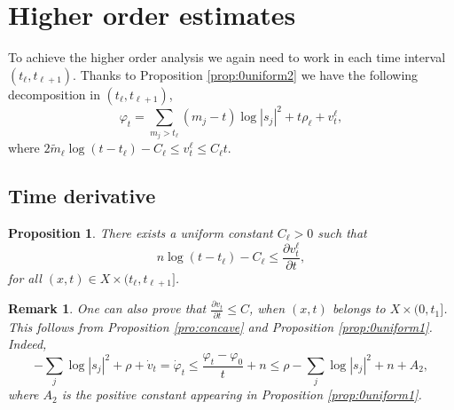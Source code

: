 \documentclass[11pt]{amsart}
\numberwithin{equation}{section}
\newtheorem{prop}[theorem]{Proposition}
\newtheorem{remark}[theorem]{Remark}
\newcommand{\f}{\varphi}
\begin{document}
  


 






\section{Higher order estimates}  \label{sec:logsmooth}

To achieve the higher order analysis we again need to  work in each time interval $(t_{\ell},t_{\ell+1})$. 
 Thanks to Proposition \ref{prop:0uniform2} we have the following decomposition in $(t_\ell, t_{\ell+1})$,
 $$
\f_t=\sum_{m_j>t_{\ell}} (m_j-t) \log |s_j|^2+t \rho_{\ell}+v_t^\ell,
$$
where $ 2 \tilde{m}_\ell \log (t-t_\ell) -C_\ell  \leq v_{t}^{\ell} \leq C_\ell t$.


   
   
 
 \subsection{Time derivative}
 
\begin{prop} \label{pro:STbelow}
There exists a uniform constant $C_\ell>0$ such that 
 $$
 n \log (t-t_{\ell}) -C_\ell \leq \frac{\partial v_t^\ell}{\partial t}, 
$$
for all $(x,t) \in X \times (t_\ell, t_{\ell +1}]$.
\end{prop}

\begin{remark}
 One can also prove that $\frac{\partial v_t}{\partial t} \leq C$, when $(x,t)$ belongs to $X \times (0,t_1]$. 
 This  follows from Proposition \ref{pro:concave} and Proposition \ref{prop:0uniform1}. Indeed,
	\[
	-\sum_j \log|s_j|^2+\rho+\dot{v}_t=\dot{\varphi}_t \leq \frac{\varphi_t-\varphi_0}{t} +n \leq \rho-\sum_j \log|s_j|^2 +n+A_2,
	\]
	where $A_2$ is the positive constant appearing in Proposition \ref{prop:0uniform1}. 
\end{remark}
\end{document}
